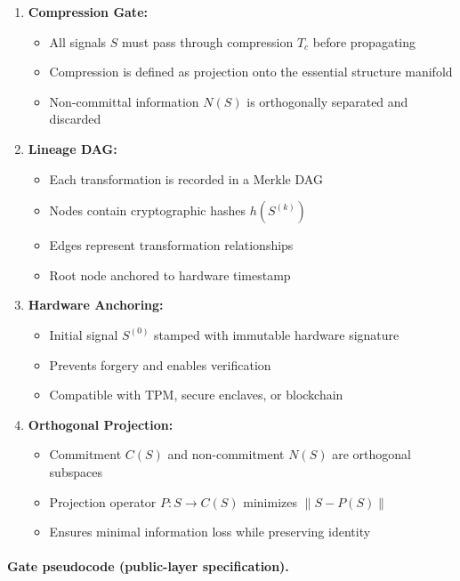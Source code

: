 \documentclass[11pt,a4paper]{article}
\begin{document}
\begin{enumerate}
    \item \textbf{Compression Gate:}
    \begin{itemize}
        \item All signals $S$ must pass through compression $T_c$ before propagating
        \item Compression is defined as projection onto the essential structure manifold
        \item Non-committal information $N(S)$ is orthogonally separated and discarded
    \end{itemize}

    \item \textbf{Lineage DAG:}
    \begin{itemize}
        \item Each transformation is recorded in a Merkle DAG
        \item Nodes contain cryptographic hashes $h(S^{(k)})$
        \item Edges represent transformation relationships
        \item Root node anchored to hardware timestamp
    \end{itemize}

    \item \textbf{Hardware Anchoring:}
    \begin{itemize}
        \item Initial signal $S^{(0)}$ stamped with immutable hardware signature
        \item Prevents forgery and enables verification
        \item Compatible with TPM, secure enclaves, or blockchain
    \end{itemize}

    \item \textbf{Orthogonal Projection:}
    \begin{itemize}
        \item Commitment $C(S)$ and non-commitment $N(S)$ are orthogonal subspaces
        \item Projection operator $P: S \rightarrow C(S)$ minimizes $\|S - P(S)\|$
        \item Ensures minimal information loss while preserving identity
    \end{itemize}
\end{enumerate}

\paragraph{Gate pseudocode (public-layer specification).}
\end{document}
